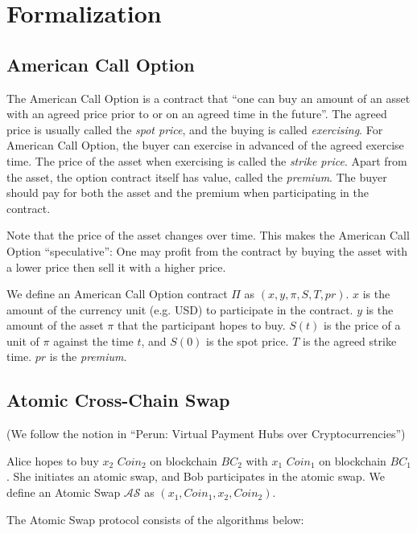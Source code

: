 \section{Formalization}
\label{sec:formalization}

\subsection{American Call Option}

The American Call Option is a contract that ``one can buy an amount of an asset with an agreed price prior to or on an agreed time in the future''.
The agreed price is usually called the \textit{spot price}, and the buying is called \textit{exercising}.
For American Call Option, the buyer can exercise in advanced of the agreed exercise time.
The price of the asset when exercising is called the \textit{strike price}.
Apart from the asset, the option contract itself has value, called the \textit{premium}.
The buyer should pay for both the asset and the premium when participating in the contract.

Note that the price of the asset changes over time. This makes the American Call Option ``speculative'': One may profit from the contract by buying the asset with a lower price then sell it with a higher price.

We define an American Call Option contract $\Pi$ as $(x, y, \pi, S, T, pr)$.
$x$ is the amount of the currency unit (e.g. USD) to participate in the contract.
$y$ is the amount of the asset $\pi$ that the participant hopes to buy.
$S(t)$ is the price of a unit of $\pi$ against the time $t$, and $S(0)$ is the spot price.
$T$ is the agreed strike time.
$pr$ is the \textit{premium}.

\subsection{Atomic Cross-Chain Swap}

(We follow the notion in ``Perun: Virtual Payment Hubs over Cryptocurrencies'')

Alice hopes to buy $x_2$ $Coin_2$ on blockchain $BC_2$ with $x_1$ $Coin_1$ on blockchain $BC_1$.
She initiates an atomic swap, and Bob participates in the atomic swap.
We define an Atomic Swap $\mathcal{AS}$ as $(x_1, Coin_1, x_2, Coin_2)$.

The Atomic Swap protocol consists of the algorithms below:

